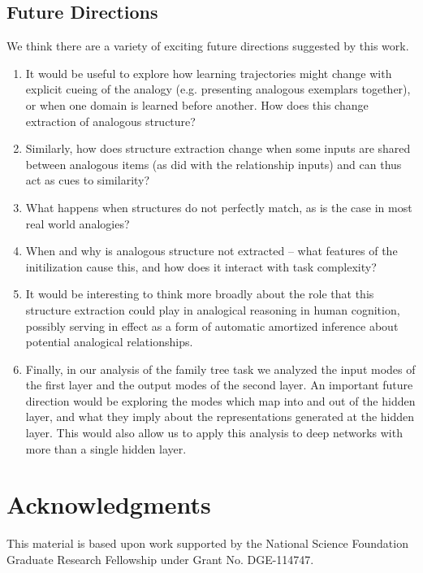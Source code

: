 \documentclass[10pt,letterpaper]{article}
\begin{document}
\subsection{Future Directions}
We think there are a variety of exciting future directions suggested by this work. 
\begin{enumerate}
\item It would be useful to explore how learning trajectories might change with explicit cueing of the analogy (e.g. presenting analogous exemplars together), or when one domain is learned before another. How does this change extraction of analogous structure?
\item Similarly, how does structure extraction change when some inputs are shared between analogous items (as \citet{Hinton1986} did with the relationship inputs) and can thus act as cues to similarity?
\item What happens when structures do not perfectly match, as is the case in most real world analogies?
\item When and why is analogous structure not extracted -- what features of the initilization cause this, and how does it interact with task complexity?
\item It would be interesting to think more broadly about the role that this structure extraction could play in analogical reasoning in human cognition, possibly serving in effect as a form of automatic amortized inference about potential analogical relationships.
\item Finally, in our analysis of the family tree task we analyzed the input modes of the first layer and the output modes of the second layer. An important future direction would be exploring the modes which map into and out of the hidden layer, and what they imply about the representations generated at the hidden layer. This would also allow us to apply this analysis to deep networks with more than a single hidden layer.
\end{enumerate}
\section{Acknowledgments}
This material is based upon work supported by the National Science Foundation Graduate Research Fellowship under Grant No. DGE-114747.


\setlength{\bibleftmargin}{.125in}
\setlength{\bibindent}{-\bibleftmargin}


\end{document}
